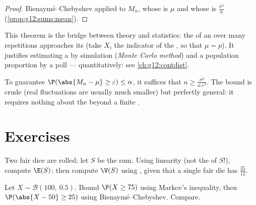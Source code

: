 \begin{proof}
Bienaymé--Chebyshev applied to $M_n$, whose  is $\mu$ and whose
 is $\frac{\sigma^2}{n}$ (\cref{prop:g12:sums:mean}).
\end{proof}

\begin{remark}
This theorem is the bridge between  theory and statistics: the
\emph{} of an  over many  repetitions approaches
its \emph{} (take $X_i$ the indicator of the , so that
$\mu = p$). It justifies estimating a  by simulation
(\emph{Monte Carlo method}) and a population proportion by a poll ---
quantitatively: see \cref{ch:g12:contdist}.
\end{remark}

\begin{method}\label{met:g12:sums:chebyshev}
To guarantee $\P(\abs{M_n - \mu} \geq \varepsilon) \leq \alpha$, it
suffices that $n \geq \frac{\sigma^2}{\alpha\,\varepsilon^2}$. The bound is
crude (real fluctuations are usually much smaller) but perfectly general:
it requires nothing about the  beyond a finite .
\end{method}

\section{Exercises}

\begin{exercise}[$\star$]\label{exo:g12:sums:1}
Two fair dice are rolled; let $S$ be the sum. Using linearity (not the
 of $S$!), compute $\E(S)$; then compute $\V(S)$ using
, given that a single fair die has  $\frac{35}{12}$.
\end{exercise}

\begin{exercise}[$\star$]\label{exo:g12:sums:2}
Let $X \sim \mathcal B(100,\ 0.5)$. Bound
$\P(X \geq 75)$ using Markov's inequality, then
$\P(\abs{X - 50} \geq 25)$ using Bienaymé--Chebyshev. Compare.
\end{exercise}

